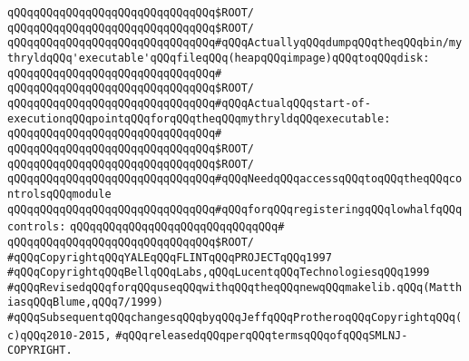 \newline
\verb|qQQqqQQqqQQqqQQqqQQqqQQqqQQqqQQq$ROOT/|\newline
\verb|qQQqqQQqqQQqqQQqqQQqqQQqqQQqqQQq$ROOT/|\newline
\newline
\verb|qQQqqQQqqQQqqQQqqQQqqQQqqQQqqQQq#qQQqActuallyqQQqdumpqQQqtheqQQqbin/mythryldqQQq'executable'qQQqfileqQQq(heapqQQqimpage)qQQqtoqQQqdisk:|\newline
\verb|qQQqqQQqqQQqqQQqqQQqqQQqqQQqqQQq#|\newline
\verb|qQQqqQQqqQQqqQQqqQQqqQQqqQQqqQQq$ROOT/|\newline
\newline
\verb|qQQqqQQqqQQqqQQqqQQqqQQqqQQqqQQq#qQQqActualqQQqstart-of-executionqQQqpointqQQqforqQQqtheqQQqmythryldqQQqexecutable:|\newline
\verb|qQQqqQQqqQQqqQQqqQQqqQQqqQQqqQQq#|\newline
\verb|qQQqqQQqqQQqqQQqqQQqqQQqqQQqqQQq$ROOT/|\newline
\verb|qQQqqQQqqQQqqQQqqQQqqQQqqQQqqQQq$ROOT/|\newline
\newline
\verb|qQQqqQQqqQQqqQQqqQQqqQQqqQQqqQQq#qQQqNeedqQQqaccessqQQqtoqQQqtheqQQqcontrolsqQQqmodule|\newline
\verb|qQQqqQQqqQQqqQQqqQQqqQQqqQQqqQQq#qQQqforqQQqregisteringqQQqlowhalfqQQqcontrols:|\newline
\verb|qQQqqQQqqQQqqQQqqQQqqQQqqQQqqQQq#|\newline
\verb|qQQqqQQqqQQqqQQqqQQqqQQqqQQqqQQq$ROOT/|\newline
\newline
\newline
\newline
\verb|#qQQqCopyrightqQQqYALEqQQqFLINTqQQqPROJECTqQQq1997|\newline
\verb|#qQQqCopyrightqQQqBellqQQqLabs,qQQqLucentqQQqTechnologiesqQQq1999|\newline
\verb|#qQQqRevisedqQQqforqQQquseqQQqwithqQQqtheqQQqnewqQQqmakelib.qQQq(MatthiasqQQqBlume,qQQq7/1999)|\newline
\verb|#qQQqSubsequentqQQqchangesqQQqbyqQQqJeffqQQqProtheroqQQqCopyrightqQQq(c)qQQq2010-2015,|\newline
\verb|#qQQqreleasedqQQqperqQQqtermsqQQqofqQQqSMLNJ-COPYRIGHT.|\newline

